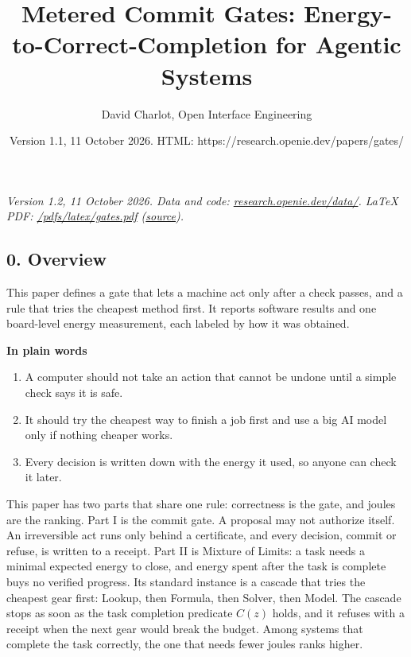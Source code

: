 \documentclass[
  10pt,
]{article}
\title{Metered Commit Gates: Energy-to-Correct-Completion for Agentic
Systems}
\author{David Charlot, Open Interface Engineering}
\date{Version 1.1, 11 October 2026. HTML:
https://research.openie.dev/papers/gates/}
\providecommand{\tightlist}{%
  \setlength{\itemsep}{0pt}\setlength{\parskip}{0pt}}
\begin{document}
\maketitle

{
\setcounter{tocdepth}{2}
\tableofcontents
}
\emph{Version 1.2, 11 October 2026. Data and code:
\href{https://research.openie.dev/data/\#gates}{research.openie.dev/data/}.
LaTeX PDF:
\href{https://research.openie.dev/pdfs/latex/gates.pdf}{/pdfs/latex/gates.pdf}
(\href{https://research.openie.dev/pdfs/latex/gates.tex}{source}).}

\subsection{0. Overview}\label{overview}

This paper defines a gate that lets a machine act only after a check
passes, and a rule that tries the cheapest method first. It reports
software results and one board-level energy measurement, each labeled by
how it was obtained.

\textbf{In plain words}

\begin{enumerate}
\def\labelenumi{\arabic{enumi}.}
\tightlist
\item
  A computer should not take an action that cannot be undone until a
  simple check says it is safe.
\item
  It should try the cheapest way to finish a job first and use a big AI
  model only if nothing cheaper works.
\item
  Every decision is written down with the energy it used, so anyone can
  check it later.
\end{enumerate}

This paper has two parts that share one rule: correctness is the gate,
and joules are the ranking. Part I is the commit gate. A proposal may
not authorize itself. An irreversible act runs only behind a
certificate, and every decision, commit or refuse, is written to a
receipt. Part II is Mixture of Limits: a task needs a minimal expected
energy to close, and energy spent after the task is complete buys no
verified progress. Its standard instance is a cascade that tries the
cheapest gear first: Lookup, then Formula, then Solver, then Model. The
cascade stops as soon as the task completion predicate \(C(z)\) holds,
and it refuses with a receipt when the next gear would break the budget.
Among systems that complete the task correctly, the one that needs fewer
joules ranks higher.
\end{document}
